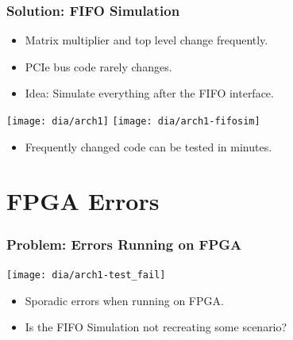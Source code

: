 \documentclass[gray]{beamer}
\begin{document}

\begin{frame}
\frametitle{Solution: FIFO Simulation}
\begin{center}
\begin{itemize}
\item Matrix multiplier and top level change frequently.
\item PCIe bus code rarely changes.
\item Idea: Simulate everything after the FIFO interface.
\end{itemize}
\texttt{[image: dia/arch1]}
\hfill
\texttt{[image: dia/arch1-fifosim]}
\begin{itemize}
\item Frequently changed code can be tested in minutes.
\end{itemize}
\end{center}
\end{frame}

\section{FPGA Errors}

\begin{frame}
\frametitle{Problem: Errors Running on FPGA}
\begin{center}
\texttt{[image: dia/arch1-test\_fail]}
\end{center}
\begin{itemize}
\item Sporadic errors when running on FPGA.
\item Is the FIFO Simulation not recreating some scenario?
\end{itemize}
\end{frame}
\end{document}
